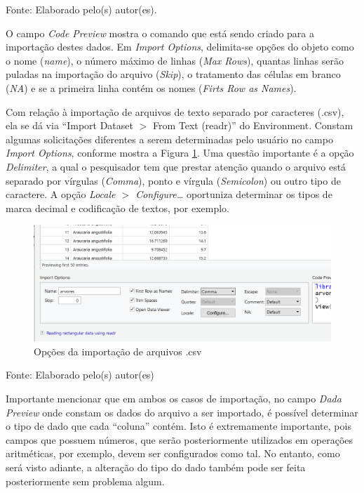 \documentclass[12pt,brazil,oneside]{book}
\begin{document}
Fonte: Elaborado pelo(s) autor(es).

O campo \emph{Code Preview} mostra o comando que está sendo criado para
a importação destes dados. Em \emph{Import Options}, delimita-se opções
do objeto como o nome (\emph{name}), o número máximo de linhas
(\emph{Max Rows}), quantas linhas serão puladas na importação do arquivo
(\emph{Skip}), o tratamento das células em branco (\emph{NA}) e se a
primeira linha contém os nomes (\emph{Firts Row as Names}).

Com relação à importação de arquivos de texto separado por caracteres
(.csv), ela se dá via ``Import Dataset \(>\) From Text (readr)'' do
Environment. Constam algumas solicitações diferentes a serem
determinadas pelo usuário no campo \emph{Import Options}, conforme
mostra a Figura \ref{fig:r4csv}. Uma questão importante é a opção
\emph{Delimiter}, a qual o pesquisador tem que prestar atenção quando o
arquivo está separado por vírgulas (\emph{Comma}), ponto e vírgula
(\emph{Semicolon}) ou outro tipo de caractere. A opção \emph{Locale
\(>\) Configure\ldots{}} oportuniza determinar os tipos de marca decimal
e codificação de textos, por exemplo.

\begin{figure}[H]

{\centering \includegraphics[width=0.8\linewidth]{r4csv} 

}

\caption{Opções da importação de arquivos .csv}\label{fig:r4csv}
\end{figure}

Fonte: Elaborado pelo(s) autor(es)

Importante mencionar que em ambos os casos de importação, no campo
\emph{Dada Preview} onde constam os dados do arquivo a ser importado, é
possível determinar o tipo de dado que cada ``coluna'' contém. Isto é
extremamente importante, pois campos que possuem números, que serão
posteriormente utilizados em operações aritméticas, por exemplo, devem
ser configurados como tal. No entanto, como será visto adiante, a
alteração do tipo do dado também pode ser feita posteriormente sem
problema algum.
\end{document}
